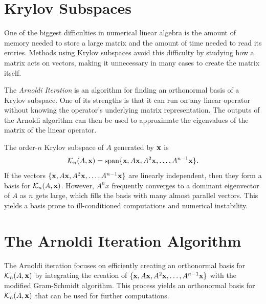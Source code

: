 
\section*{Krylov Subspaces} %

One of the biggest difficulties in numerical linear algebra is the amount of memory needed to store a large matrix and the amount of time needed to read its entries.
Methods using Krylov subspaces avoid this difficulty by studying how a matrix acts on vectors, making it unnecessary in many cases to create the matrix itself.

The \emph{Arnoldi Iteration} is an algorithm for finding an orthonormal basis of a Krylov subspace.
One of its strengths is that it can run on any linear operator without knowing the operator's underlying matrix representation.
The outputs of the Arnoldi algorithm can then be used to approximate the eigenvalues of the matrix of the linear operator.

The order-$n$ Krylov subspace of $A$ generated by $\mathbf{x}$ is
\[
\mathcal{K}_n(A, \mathbf{x}) =\text{span} \{\mathbf{x}, A\mathbf{x}, A^2\mathbf{x}, \ldots, A^{n-1}\mathbf{x}\}.
\]
If the vectors $\{\mathbf{x}, A\mathbf{x}, A^2\mathbf{x}, \ldots, A^{n-1}\mathbf{x}\}$ are linearly independent, then they form a basis for $\mathcal{K}_n(A,\mathbf{x})$.
However, $A^n x$ frequently converges to a dominant eigenvector of $A$ as $n$ gets large, which fills the basis with many almost parallel vectors.
This yields a basis prone to ill-conditioned computations and numerical instability.

\section*{The Arnoldi Iteration Algorithm} %

The Arnoldi iteration focuses on efficiently creating an orthonormal basis for $\mathcal{K}_n(A,\mathbf{x})$ by integrating the creation of $\{\mathbf{x}, A\mathbf{x}, A^2\mathbf{x}, \ldots, A^{n-1}\mathbf{x}\}$ with the modified Gram-Schmidt algorithm.
This process yields an orthonormal basis for $\mathcal{K}_n(A,\mathbf{x})$ that can be used for further computations.

